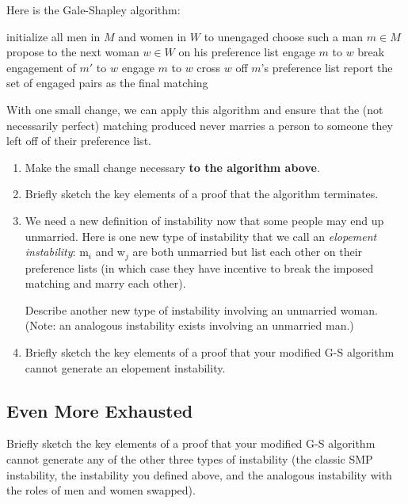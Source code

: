 \documentclass[11pt, oneside]{article}   	%
\theoremstyle{definition}
\theoremstyle{remark}
\begin{document}
Here is the Gale-Shapley algorithm:
  \begin{algorithmic}[1]
    \State initialize all men in $M$ and women in $W$ to unengaged
      \State choose such a man $m \in M$
      \State propose to the next woman $w \in W$ on his preference list
        \State engage $m$ to $w$
        \State break engagement of $m'$ to $w$
        \State engage $m$ to $w$
      \EndIf
      \State cross $w$ off $m$'s preference list
    \EndWhile
    \State report the set of engaged pairs as the final matching
  \EndProcedure
  \end{algorithmic}
With one small change, we can apply this algorithm and ensure that the
(not necessarily perfect) matching produced never marries a person to
someone they left off of their preference list.
\begin{enumerate}
\item Make the small change necessary \textbf{to the algorithm above}.
\item Briefly sketch the key elements of a proof that the algorithm
   terminates.
\item We need a new definition of instability now that some people may
   end up unmarried. Here is one new type of instability that we call
   an \emph{elopement instability}: m$_i$ and w$_j$ are both unmarried but list
   each other on their preference lists (in which case they have
   incentive to break the imposed matching and marry each other).
   
   Describe another new type of instability involving an unmarried
   woman. (Note: an analogous instability exists involving an
   unmarried man.)
\item Briefly sketch the key elements of a proof that your modified G-S
   algorithm cannot generate an elopement instability.
\end{enumerate}
\subsection{Even More Exhausted}

Briefly sketch the key elements of a proof that your modified G-S
algorithm cannot generate any of the other three types of instability
(the classic SMP instability, the instability you defined above, and
the analogous instability with the roles of men and women swapped).
\end{document}
